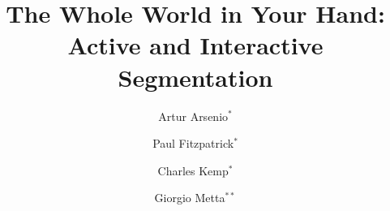 \documentclass[letter]{epirob}
\begin{document}


\title{The Whole World in Your Hand:\\
Active and Interactive Segmentation}






\author{Artur Arsenio$^{*}$ \and Paul Fitzpatrick$^{*}$ \and Charles Kemp$^{*}$ \and Giorgio Metta$^{**}$}



\maketitle





















\end{document}
